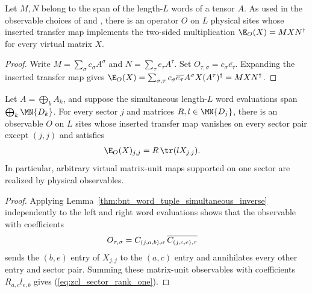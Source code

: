 \begin{lemma}%
    \label{thm:physical_observable_word_span_mul}
    \leanok
    Let $M,N$ belong to the span of the length-$L$ words of a tensor $A$. As
    used in the observable choices of
    \cite[Appendix~C]{Cirac2017MPDO_AnnPhys} and
    \cite[Lemma~2]{Malz2024Preparation}, there is an operator $O$ on $L$
    physical sites whose inserted transfer map implements the two-sided
    multiplication $\E_O(X)=MXN^\dagger$ for every virtual matrix $X$.
\end{lemma}
\begin{proof}\leanok
    Write $M=\sum_\sigma c_\sigma A^\sigma$ and
    $N=\sum_\tau e_\tau A^\tau$. Set
    $O_{\tau,\sigma}=c_\sigma\overline{e_\tau}$. Expanding the inserted
    transfer map gives
    $\E_O(X)=\sum_{\sigma,\tau}c_\sigma\overline{e_\tau}
        A^\sigma X(A^\tau)^\dagger=MXN^\dagger$.
\end{proof}

\begin{lemma}%
    \label{thm:bnt_sector_supported_physical_observable}
    \leanok
    Let $A=\bigoplus_k A_k$, and suppose the simultaneous length-$L$ word
    evaluations span $\bigoplus_k\MN{D_k}$. For every sector $j$ and matrices
    $R,l\in\MN{D_j}$, there is an observable $O$ on $L$ sites whose inserted
    transfer map vanishes on every sector pair except $(j,j)$ and satisfies
    \begin{align}
        \E_O(X)_{j,j}
         & =R\,\tr(lX_{j,j}).
        \label{eq:zcl_sector_rank_one}
    \end{align}
    In particular, arbitrary virtual matrix-unit maps supported on one sector
    are realized by physical observables.
\end{lemma}
\begin{proof}\leanok
    Applying Lemma~\ref{thm:bnt_word_tuple_simultaneous_inverse}
    independently to the left and right word evaluations shows that the
    observable with coefficients
    \begin{align}
        O_{\tau,\sigma}
         & =C_{(j,a,b),\sigma}\,
        \overline{C_{(j,c,e),\tau}}
        \notag
    \end{align}
    sends the $(b,e)$ entry of $X_{j,j}$ to the $(a,c)$ entry and annihilates
    every other entry and sector pair. Summing these matrix-unit observables
    with coefficients $R_{a,c}l_{e,b}$ gives
    (\ref{eq:zcl_sector_rank_one}).
\end{proof}

